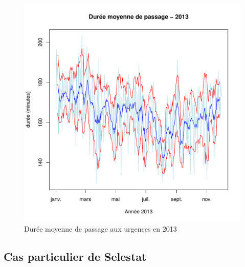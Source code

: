 \documentclass[12pt,english,french,twoside]{report}\usepackage[]{graphicx}\usepackage[]{color}
\makeatletter
\def\maxwidth{ %
  \ifdim\Gin@nat@width>\linewidth
    \linewidth
  \else
    \Gin@nat@width
  \fi
}
\newenvironment{knitrout}{}{} %
\makeatother
\begin{document}
\begin{figure}[ht!]
 \centering
\begin{knitrout}
\color{fgcolor}
\includegraphics[width=\maxwidth]{figure/graphe_duree_moyenne_passage} 

\end{knitrout}

 \caption{Durée moyenne de passage aux urgences en 2013}
\end{figure}



\subsection{Cas particulier de Selestat}
\end{document}
